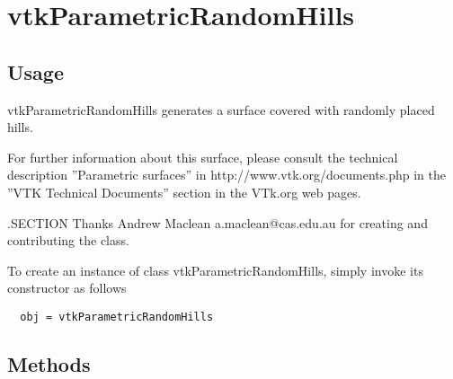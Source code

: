 \section{vtkParametricRandomHills}

\subsection{Usage}

 vtkParametricRandomHills generates a surface covered with randomly placed hills.

 For further information about this surface, please consult the 
 technical description ''Parametric surfaces'' in http://www.vtk.org/documents.php 
 in the ''VTK Technical Documents'' section in the VTk.org web pages.

 .SECTION Thanks
 Andrew Maclean a.maclean@cas.edu.au for 
 creating and contributing the class.


To create an instance of class vtkParametricRandomHills, simply
invoke its constructor as follows
\begin{verbatim}
  obj = vtkParametricRandomHills
\end{verbatim}
\subsection{Methods}

